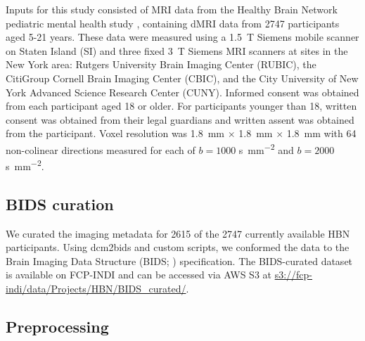 \documentclass[9pt,lineno]{elife}
\begin{document}
Inputs for this study consisted of MRI data from the Healthy Brain Network
pediatric mental health study \citep{alexander2017-yc}, containing dMRI data from
\num{2747} participants aged 5-21 years. These data were measured using a
\qty{1.5}{\tesla} Siemens mobile scanner on Staten Island (SI) and three fixed
\qty{3}{\tesla} Siemens MRI scanners at sites in the New York area: Rutgers
University Brain Imaging Center (RUBIC), the CitiGroup Cornell Brain Imaging
Center (CBIC), and the City University of New York Advanced Science Research
Center (CUNY). Informed consent was obtained from each participant aged 18 or
older. For participants younger than 18, written consent was obtained from their
legal guardians and written assent was obtained from the participant. Voxel
resolution was \qty{1.8}{\mm} $\times$ \qty{1.8}{\mm} $\times$ \qty{1.8}{\mm} with \num{64} non-colinear
directions measured for each of $b=1000$ \unit{\second \per \mm^{2}} and
$b=2000$ \unit{\second \per \mm^{2}}.

\subsection{BIDS curation}

We curated the imaging metadata for \num{2615} of the \num{2747} currently
available HBN participants. Using dcm2bids and custom scripts, we conformed the data
to the Brain Imaging Data Structure (BIDS; \citep{gorgolewski2016-lh})
specification. The BIDS-curated dataset is available on FCP-INDI and can be
accessed via AWS S3 at \url{s3://fcp-indi/data/Projects/HBN/BIDS_curated/}.



\subsection{Preprocessing}
\end{document}

